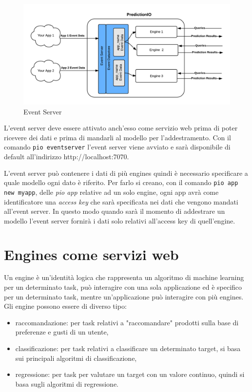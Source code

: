 \newpage

\begin{figure}[!ht]
\includegraphics[width=1.0\textwidth]{immagini/eventserver.png}
\caption{Event Server \cite{sitopredictionio}}
\label{fig:eventserver}
\end{figure}

L'event server deve essere attivato anch'esso come servizio web prima di poter ricevere dei dati e prima di mandarli al modello per l'addestramento. Con il comando \verb+pio eventserver+ l'event server viene avviato e sarà disponibile di default all'indirizzo http://localhost:7070.

L'event server può contenere i dati di più engines quindi è necessario specificare a quale modello ogni dato è riferito. Per farlo si creano, con il comando \verb+pio app new myapp+, delle \textit{pio app} relative ad un solo engine, ogni app avrà come identificatore una \textit{access key} che sarà specificata nei dati che vengono mandati all'event server. In questo modo quando sarà il momento di addestrare un modello l'event server fornirà i dati solo relativi all'access key di quell'engine.

\section{Engines come servizi web}
Un engine è un'identità logica che rappresenta un algoritmo di machine learning per un determinato task, può interagire con una sola applicazione ed è specifico per un determinato task, mentre un'applicazione può interagire con più engines. Gli engine possono essere di diverso tipo:
\begin{itemize}
\item raccomandazione: per task relativi a "raccomandare" prodotti sulla base di preferenze e gusti di un utente,
\item classificazione: per task relativi a classificare un determinato target, si basa sui principali algoritmi di classificazione,
\item regressione: per task per valutare un target con un valore continuo, quindi si basa sugli algoritmi di regressione.
\end{itemize}

